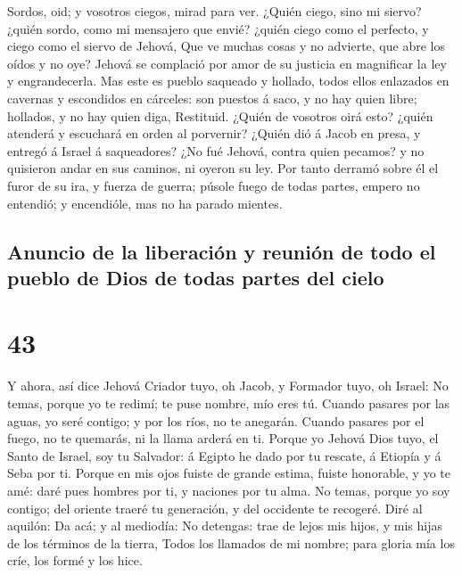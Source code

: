  Sordos, oid; y vosotros ciegos, mirad para ver.
 ¿Quién ciego, sino mi siervo? ¿quién sordo, como mi
mensajero que envié? ¿quién ciego como el perfecto, y ciego como el
siervo de Jehová,  Que ve muchas cosas y no advierte, que
abre los oídos y no oye?  Jehová se complació por amor de
su justicia en magnificar la ley y engrandecerla.  Mas
este es pueblo saqueado y hollado, todos ellos enlazados en cavernas y
escondidos en cárceles: son puestos á saco, y no hay quien libre;
hollados, y no hay quien diga, Restituid.  ¿Quién de
vosotros oirá esto? ¿quién atenderá y escuchará en orden al porvernir?
 ¿Quién dió á Jacob en presa, y entregó á Israel á
saqueadores? ¿No fué Jehová, contra quien pecamos? y no quisieron andar
en sus caminos, ni oyeron su ley.  Por tanto derramó
sobre él el furor de su ira, y fuerza de guerra; púsole fuego de todas
partes, empero no entendió; y encendióle, mas no ha parado mientes.

\hypertarget{anuncio-de-la-liberaciuxf3n-y-reuniuxf3n-de-todo-el-pueblo-de-dios-de-todas-partes-del-cielo}{%
\subsection{Anuncio de la liberación y reunión de todo el pueblo de Dios
de todas partes del
cielo}\label{anuncio-de-la-liberaciuxf3n-y-reuniuxf3n-de-todo-el-pueblo-de-dios-de-todas-partes-del-cielo}}

\hypertarget{section-42}{%
\section{43}\label{section-42}}

 Y ahora, así dice Jehová Criador tuyo, oh Jacob, y
Formador tuyo, oh Israel: No temas, porque yo te redimí; te puse nombre,
mío eres tú.  Cuando pasares por las aguas, yo seré
contigo; y por los ríos, no te anegarán. Cuando pasares por el fuego, no
te quemarás, ni la llama arderá en ti.  Porque yo Jehová
Dios tuyo, el Santo de Israel, soy tu Salvador: á Egipto he dado por tu
rescate, á Etiopía y á Seba por ti.  Porque en mis ojos
fuiste de grande estima, fuiste honorable, y yo te amé: daré pues
hombres por ti, y naciones por tu alma.  No temas, porque
yo soy contigo; del oriente traeré tu generación, y del occidente te
recogeré.  Diré al aquilón: Da acá; y al mediodía: No
detengas: trae de lejos mis hijos, y mis hijas de los términos de la
tierra,  Todos los llamados de mi nombre; para gloria mía
los críe, los formé y los hice.

